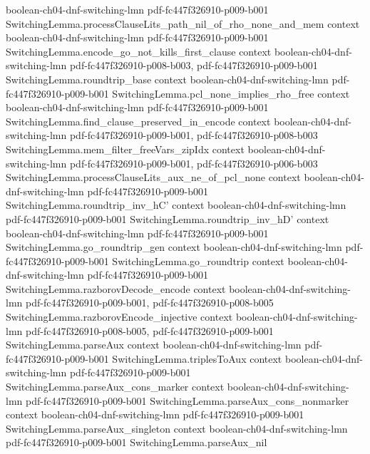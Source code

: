 \begin{theorem}
  {boolean-ch04-dnf-switching-lmn}
  {pdf-fc447f326910-p009-b001}
\proofstep
  {SwitchingLemma.processClauseLits_path_nil_of_rho_none_and_mem}
  {context}
  {boolean-ch04-dnf-switching-lmn}
  {pdf-fc447f326910-p009-b001}
\proofstep
  {SwitchingLemma.encode_go_not_kills_first_clause}
  {context}
  {boolean-ch04-dnf-switching-lmn}
  {pdf-fc447f326910-p008-b003,
    pdf-fc447f326910-p009-b001}
\proofstep
  {SwitchingLemma.roundtrip_base}
  {context}
  {boolean-ch04-dnf-switching-lmn}
  {pdf-fc447f326910-p009-b001}
\proofstep
  {SwitchingLemma.pcl_none_implies_rho_free}
  {context}
  {boolean-ch04-dnf-switching-lmn}
  {pdf-fc447f326910-p009-b001}
\proofstep
  {SwitchingLemma.find_clause_preserved_in_encode}
  {context}
  {boolean-ch04-dnf-switching-lmn}
  {pdf-fc447f326910-p009-b001,
    pdf-fc447f326910-p008-b003}
\proofstep
  {SwitchingLemma.mem_filter_freeVars_zipIdx}
  {context}
  {boolean-ch04-dnf-switching-lmn}
  {pdf-fc447f326910-p009-b001,
    pdf-fc447f326910-p006-b003}
\proofstep
  {SwitchingLemma.processClauseLits_aux_ne_of_pcl_none}
  {context}
  {boolean-ch04-dnf-switching-lmn}
  {pdf-fc447f326910-p009-b001}
\proofstep
  {SwitchingLemma.roundtrip_inv_hC'}
  {context}
  {boolean-ch04-dnf-switching-lmn}
  {pdf-fc447f326910-p009-b001}
\proofstep
  {SwitchingLemma.roundtrip_inv_hD'}
  {context}
  {boolean-ch04-dnf-switching-lmn}
  {pdf-fc447f326910-p009-b001}
\proofstep
  {SwitchingLemma.go_roundtrip_gen}
  {context}
  {boolean-ch04-dnf-switching-lmn}
  {pdf-fc447f326910-p009-b001}
\proofstep
  {SwitchingLemma.go_roundtrip}
  {context}
  {boolean-ch04-dnf-switching-lmn}
  {pdf-fc447f326910-p009-b001}
\proofstep
  {SwitchingLemma.razborovDecode_encode}
  {context}
  {boolean-ch04-dnf-switching-lmn}
  {pdf-fc447f326910-p009-b001,
    pdf-fc447f326910-p008-b005}
\proofstep
  {SwitchingLemma.razborovEncode_injective}
  {context}
  {boolean-ch04-dnf-switching-lmn}
  {pdf-fc447f326910-p008-b005,
    pdf-fc447f326910-p009-b001}
\proofstep
  {SwitchingLemma.parseAux}
  {context}
  {boolean-ch04-dnf-switching-lmn}
  {pdf-fc447f326910-p009-b001}
\proofstep
  {SwitchingLemma.triplesToAux}
  {context}
  {boolean-ch04-dnf-switching-lmn}
  {pdf-fc447f326910-p009-b001}
\proofstep
  {SwitchingLemma.parseAux_cons_marker}
  {context}
  {boolean-ch04-dnf-switching-lmn}
  {pdf-fc447f326910-p009-b001}
\proofstep
  {SwitchingLemma.parseAux_cons_nonmarker}
  {context}
  {boolean-ch04-dnf-switching-lmn}
  {pdf-fc447f326910-p009-b001}
\proofstep
  {SwitchingLemma.parseAux_singleton}
  {context}
  {boolean-ch04-dnf-switching-lmn}
  {pdf-fc447f326910-p009-b001}
\proofstep
  {SwitchingLemma.parseAux_nil}

\end{theorem}
